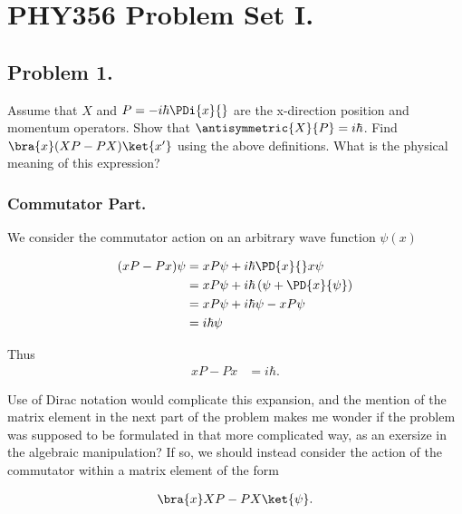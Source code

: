 
%

\chapter{PHY356 Problem Set I.}
\label{chap:qmIproblemSet1}

\beginArtNoToc

\section{Problem 1.}

Assume that $X$ and $P = -i \hbar \PDi{x}{}$ are the x-direction position and momentum operators. Show that $\antisymmetric{X}{P}=i\hbar$. Find $\bra{x}(XP-PX)\ket{x'}$ using the above definitions. What is the physical meaning of this expression?

\subsection{Commutator Part.}

We consider the commutator action on an arbitrary wave function $\psi(x)$

\begin{align*}
(x P - P x)\psi
&=
x P \psi + i\hbar \PD{x}{} x \psi \\
&=
x P \psi + i\hbar \left(\psi + \PD{x}{\psi} \right) \\
&=
x P \psi + i \hbar \psi - x P \psi \\
&=
i \hbar \psi
\end{align*}

Thus 
\begin{align*}
x P - P x &= i\hbar.
\end{align*}

Use of Dirac notation would complicate this expansion, and the mention of the matrix element in the next part of the problem makes me wonder if the problem was supposed to be formulated in that more complicated way, as an exersize in the algebraic manipulation?  If so, we should instead consider the action of the commutator within a matrix element of the form

\begin{align*}
\bra{x} XP - PX \ket{\psi}.
\end{align*}

